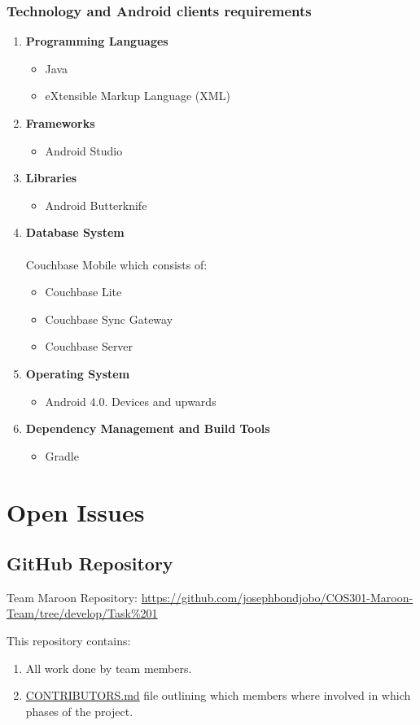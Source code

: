 \documentclass[a4paper,10pt]{article}
\begin{document}
	\subsubsection{Technology and Android clients requirements}
\begin{enumerate}
 \item \textbf{Programming Languages}
	\begin{itemize}
		\item Java
		\item eXtensible Markup Language (XML)
	\end{itemize}
\item \textbf{Frameworks}
	\begin{itemize}
		\item Android Studio
	\end{itemize}
\item \textbf{Libraries}
	\begin{itemize}
		\item Android Butterknife
	\end{itemize}
\item \textbf{Database System} \\ \\ 
Couchbase Mobile which consists of:
	\begin{itemize}
 		\item Couchbase Lite
		\item Couchbase Sync Gateway
		\item Couchbase Server
	\end{itemize}
\item \textbf{Operating System}
	\begin{itemize}
 		\item Android 4.0. Devices and upwards
	\end{itemize}
\item \textbf{Dependency Management and Build Tools}
	\begin{itemize}
		\item Gradle
	\end{itemize}

\end{enumerate}
	

\clearpage
\section{Open Issues}
\subsection {GitHub Repository}
Team Maroon Repository: \url{https://github.com/josephbondjobo/COS301-Maroon-Team/tree/develop/Task%201}

This repository contains:
\begin{enumerate}
\item All work done by team members.
\item \href{https://github.com/josephbondjobo/COS301-Maroon-Team/blob/develop/Intro/Contributors.md}{CONTRIBUTORS.md} file outlining which members where involved in which phases of the project.
\end{enumerate}



\newpage
\clearpage
{}
\end{document}
